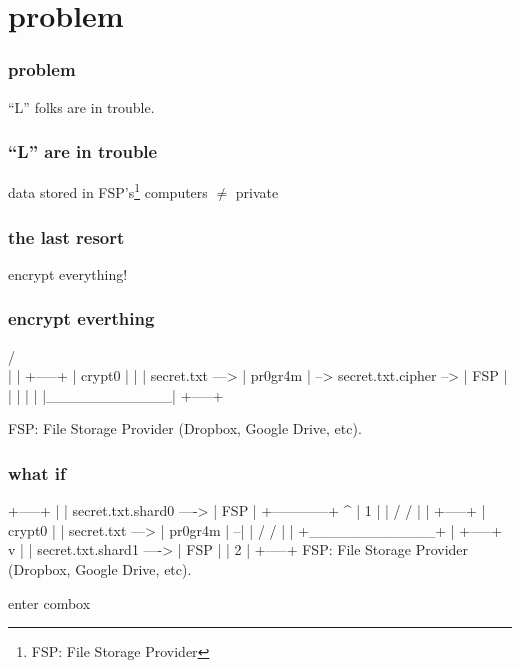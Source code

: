 
\section{problem}

\begin{frame}
  \frametitle{problem}
  \centering
  ``L'' folks are in trouble.
\end{frame}

\begin{frame}
  \frametitle{``L'' are in trouble}
  \centering
  data stored in FSP's\footnote{FSP: File Storage Provider} computers $\ne$ private
\end{frame}

\begin{frame}
  \frametitle{the last resort}
  \centering
  encrypt everything!
\end{frame}

\begin{frame}[fragile]
  \frametitle{encrypt everthing}
  {\tiny
  \begin{semiverbatim}
                        /^^^^^^^^^^^^\\
                        |            |                           +-----+
                        |  crypt0    |                           |     |
        secret.txt ---> |  pr0gr4m   | --> secret.txt.cipher --> | FSP |
                        |            |                           |     |
                        |____________|                           +-----+

     FSP: File Storage Provider (Dropbox, Google Drive, etc).
  \end{semiverbatim}
  }
\end{frame}

\begin{frame}[fragile]
  \frametitle{what if}

  {\tiny
  \begin{semiverbatim}
                                                             +-----+
                                                             |     |
                                  secret.txt.shard0   ---->  | FSP |
                   +------------+   ^                        |  1  |
                   |  /     /   |   |                        +-----+
                   |  crypt0    |   |
   secret.txt ---> |  pr0gr4m   | --|
                   | /     /    |   |
                   +____________+   |                        +-----+
                                    v                        |     |
                                  secret.txt.shard1   ---->  | FSP |
                                                             |  2  |
                                                             +-----+
FSP: File Storage Provider (Dropbox, Google Drive, etc).
  \end{semiverbatim}
  }

\end{frame}

\begin{frame}
  \centering
  enter combox
\end{frame}
